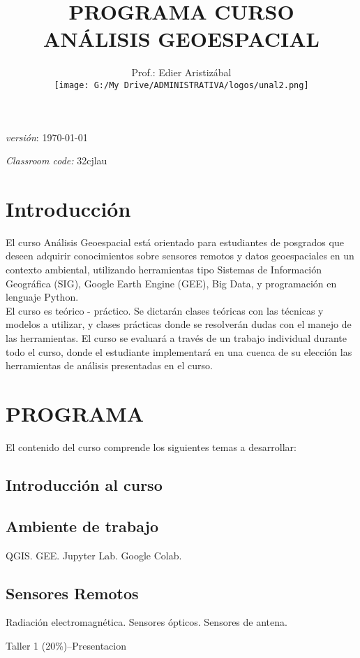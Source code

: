 \documentclass[a4paper,twoside,11pt,]{article}
\title {PROGRAMA  CURSO\\ ANÁLISIS GEOESPACIAL}
\author{Prof.: Edier Aristizábal\\[5ex]
\texttt{[image: G:/My Drive/ADMINISTRATIVA/logos/unal2.png]}
}
\date{}
\begin{document}
\maketitle

\emph {versión}: \today

\emph {Classroom code:} 32cjlau

\section* {Introducción}
El curso Análisis Geoespacial está orientado para estudiantes de posgrados que deseen adquirir conocimientos sobre sensores remotos y datos geoespaciales en un contexto ambiental, utilizando herramientas tipo Sistemas de Información Geográfica (SIG), Google Earth Engine (GEE), Big Data, y programación en lenguaje Python.\\
El curso es teórico - práctico. Se dictarán clases teóricas con las técnicas y modelos a utilizar, y clases prácticas donde se resolverán dudas con el manejo de las herramientas. El curso se evaluará a través de un trabajo individual durante todo el curso, donde el estudiante implementará en una cuenca de su elección las herramientas de análisis presentadas en el curso.

\section{PROGRAMA}
El contenido del curso comprende los siguientes temas a desarrollar:\\

\subsection*{Introducción al curso}

\subsection {Ambiente de trabajo}
QGIS. GEE. Jupyter Lab. Google Colab.

\subsection {Sensores Remotos}
Radiación electromagnética. Sensores ópticos. Sensores de antena.

\begin{tcolorbox}[enhanced,width=5in,center upper,  fontupper=\large\bfseries,drop shadow southwest,sharp corners]
Taller 1 (20\%)--Presentacion 
\end{tcolorbox}
\end{document}
